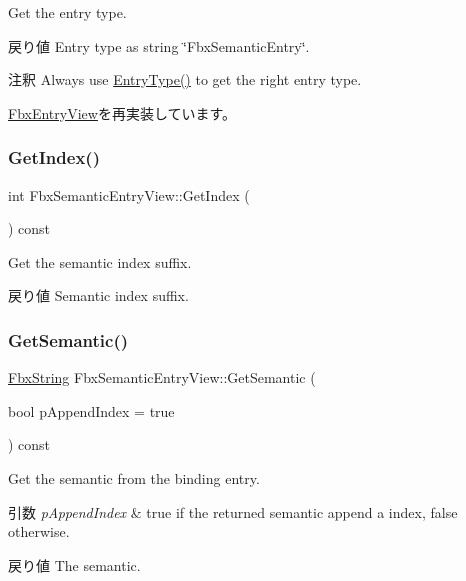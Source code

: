 Get the entry type. \begin{DoxyReturn}{戻り値}
Entry type as string \char`\"{}\+Fbx\+Semantic\+Entry\char`\"{}. 
\end{DoxyReturn}
\begin{DoxyRemark}{注釈}
Always use \hyperlink{class_fbx_semantic_entry_view_afd242ecac3eaab584dffe108753aba1d}{Entry\+Type()} to get the right entry type. 
\end{DoxyRemark}


\hyperlink{class_fbx_entry_view_a83ee50482b441ba8b0e6d7c2dba5432f}{Fbx\+Entry\+View}を再実装しています。

\mbox{\label{class_fbx_semantic_entry_view_a9163df1576880dd1fa1922eeeb122dfd}} 
\subsubsection{\texorpdfstring{Get\+Index()}{GetIndex()}}
{\footnotesize\ttfamily int Fbx\+Semantic\+Entry\+View\+::\+Get\+Index (\begin{DoxyParamCaption}{ }\end{DoxyParamCaption}) const}

Get the semantic index suffix. \begin{DoxyReturn}{戻り値}
Semantic index suffix. 
\end{DoxyReturn}
\mbox{\label{class_fbx_semantic_entry_view_ac1419433cb4547f9cbd42e4855976e43}} 
\subsubsection{\texorpdfstring{Get\+Semantic()}{GetSemantic()}}
{\footnotesize\ttfamily \hyperlink{class_fbx_string}{Fbx\+String} Fbx\+Semantic\+Entry\+View\+::\+Get\+Semantic (\begin{DoxyParamCaption}\item[{bool}]{p\+Append\+Index = {\ttfamily true} }\end{DoxyParamCaption}) const}

Get the semantic from the binding entry. 
\begin{DoxyParams}{引数}
{\em p\+Append\+Index} & {\ttfamily true} if the returned semantic append a index, {\ttfamily false} otherwise. \\
\hline
\end{DoxyParams}
\begin{DoxyReturn}{戻り値}
The semantic. 
\end{DoxyReturn}
\mbox{\label{class_fbx_semantic_entry_view_a602f170055f7dc100360d0d11bb88c56}} 
